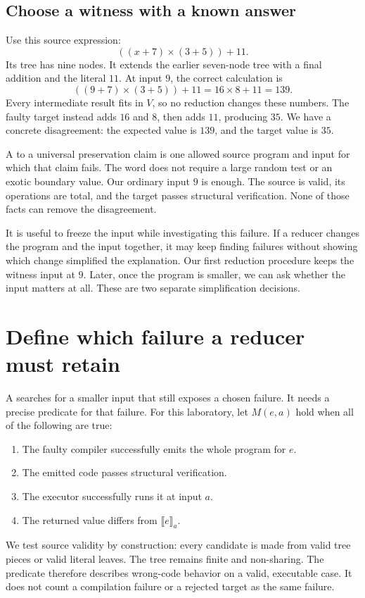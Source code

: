\subsection{Choose a witness with a known answer}
\label{sec:tiny-fault-witness}

Use this source expression:
\[
  ((x+7)\times(3+5))+11.
\]
Its tree has nine nodes.
It extends the earlier seven-node tree with a final addition and the literal $11$.
At input $9$, the correct calculation is
\[
  ((9+7)\times(3+5))+11=16\times8+11=139.
\]
Every intermediate result fits in $V$, so no reduction changes these numbers.
The faulty target instead adds $16$ and $8$, then adds $11$, producing $35$.
We have a concrete disagreement: the expected value is $139$, and the target value is $35$.

A  to a universal preservation claim is one allowed source program and input for which that claim fails.
The word does not require a large random test or an exotic boundary value.
Our ordinary input $9$ is enough.
The source is valid, its operations are total, and the target passes structural verification.
None of those facts can remove the disagreement.

It is useful to freeze the input while investigating this failure.
If a reducer changes the program and the input together, it may keep finding failures without showing which change simplified the explanation.
Our first reduction procedure keeps the witness input at $9$.
Later, once the program is smaller, we can ask whether the input matters at all.
These are two separate simplification decisions.

\section{Define which failure a reducer must retain}
\label{sec:tiny-reduction-predicate}

A  searches for a smaller input that still exposes a chosen failure.
It needs a precise predicate for that failure.
For this laboratory, let $M(e,a)$ hold when all of the following are true:
\begin{enumerate}
  \item The faulty compiler successfully emits the whole program for $e$.
  \item The emitted code passes structural verification.
  \item The executor successfully runs it at input $a$.
  \item The returned value differs from $\llbracket e\rrbracket_a$.
\end{enumerate}
We test source validity by construction: every candidate is made from valid tree pieces or valid literal leaves.
The tree remains finite and non-sharing.
The predicate therefore describes wrong-code behavior on a valid, executable case.
It does not count a compilation failure or a rejected target as the same failure.

